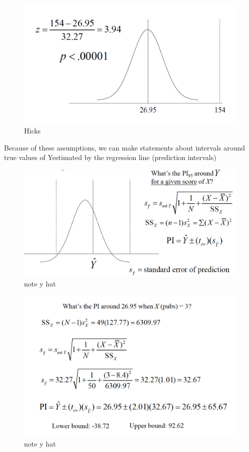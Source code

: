 \documentclass[]{book}
\theoremstyle{definition}
\theoremstyle{definition}
\theoremstyle{definition}
\theoremstyle{remark}
\begin{document}
{\begin{figure}
\centering
\includegraphics{img/hicksreg16.png}
\caption{Hicks}
\end{figure}

Because of these assumptions, we can make statements about intervals
around true values of Yestimated by the regression line (prediction
intervals)

\begin{figure}
\centering
\includegraphics{img/hicksreg17.png}
\caption{note y hat}
\end{figure}

\begin{figure}
\centering
\includegraphics{img/hicksreg18.png}
\caption{note y hat}
\end{figure}

}
\end{document}

